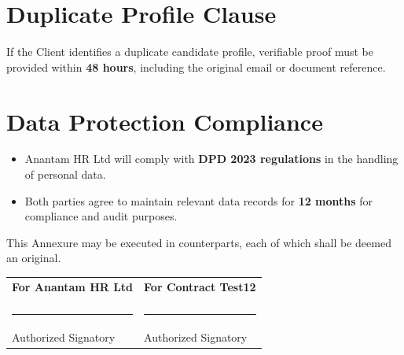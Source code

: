 \documentclass[12pt]{article}
\begin{document}
\section{Duplicate Profile Clause}

If the Client identifies a duplicate candidate profile, verifiable proof must be provided within \textbf{48 hours}, including the original email or document reference.

\section{Data Protection Compliance}

\begin{itemize}
\item Anantam HR Ltd will comply with \textbf{DPD 2023 regulations} in the handling of personal data.

\item Both parties agree to maintain relevant data records for \textbf{12 months} for compliance and audit purposes.
\end{itemize}

\vspace{1cm}

This Annexure may be executed in counterparts, each of which shall be deemed an original.

\vspace{1.5cm}

\begin{tabular}{p{7cm} p{7cm}}

\textbf{For Anantam HR Ltd} & \textbf{For Contract Test12} \\

\vspace{2cm} & \vspace{2cm} \\

\rule{6cm}{0.4pt} & \rule{6cm}{0.4pt} \\
Authorized Signatory & Authorized Signatory \\

\end{tabular}
\end{document}
